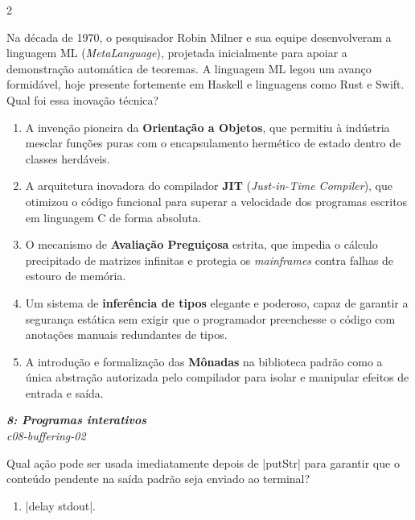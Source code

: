 \documentclass[a4paper,10pt,brazil]{article}
\begin{document}
\begin{multicols}{2}
\begin{flushright}
\end{flushright}
Na década de 1970, o pesquisador Robin Milner e sua equipe desenvolveram a linguagem ML (\emph{MetaLanguage}), projetada inicialmente para apoiar a demonstração automática de teoremas. A linguagem ML legou um avanço formidável, hoje presente fortemente em Haskell e linguagens como Rust e Swift. Qual foi essa inovação técnica?

\begin{enumerate}
  \item A invenção pioneira da \textbf{Orientação a Objetos}, que permitiu à indústria mesclar funções puras com o encapsulamento hermético de estado dentro de classes herdáveis.

  \item A arquitetura inovadora do compilador \textbf{JIT} (\emph{Just-in-Time Compiler}), que otimizou o código funcional para superar a velocidade dos programas escritos em linguagem C de forma absoluta.

  \item O mecanismo de \textbf{Avaliação Preguiçosa} estrita, que impedia o cálculo precipitado de matrizes infinitas e protegia os \emph{mainframes} contra falhas de estouro de memória.

  \item Um sistema de \textbf{inferência de tipos} elegante e poderoso, capaz de garantir a segurança estática sem exigir que o programador preenchesse o código com anotações manuais redundantes de tipos.

  \item A introdução e formalização das \textbf{Mônadas} na biblioteca padrão como a única abstração autorizada pelo compilador para isolar e manipular efeitos de entrada e saída.


\end{enumerate}

\begin{flushright}
  \footnotesize
  \textit{\textbf{8: Programas interativos}}\\
  \textit{c08-buffering-02}\\

\end{flushright}
Qual ação pode ser usada imediatamente depois de \haskellinline|putStr| para garantir que o conteúdo pendente na saída padrão seja enviado ao terminal?

\begin{enumerate}
  \item \haskellinline|delay stdout|.


\end{enumerate}
\end{multicols}
\end{document}
